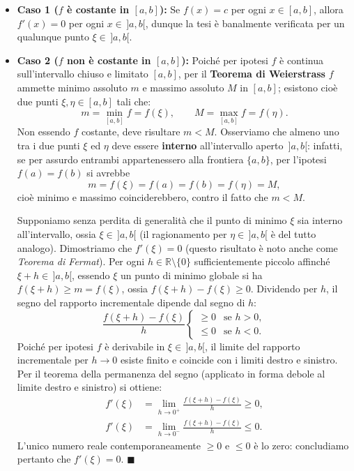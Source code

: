 \begin{itemize}
    \item \textbf{Caso 1 ($f$ è costante in $[a,b]$):} Se $f(x) = c$ per ogni $x \in [a,b]$, allora $f'(x) = 0$ per ogni $x \in \,]a,b[$, dunque la tesi è banalmente verificata per un qualunque punto $\xi \in \,]a,b[$.

    \item \textbf{Caso 2 ($f$ non è costante in $[a,b]$):} Poiché per ipotesi $f$ è continua sull'intervallo chiuso e limitato $[a,b]$, per il \textbf{Teorema di Weierstrass} $f$ ammette minimo assoluto $m$ e massimo assoluto $M$ in $[a,b]$; esistono cioè due punti $\xi, \eta \in [a,b]$ tali che:
    \[
        m = \min_{[a,b]} f = f(\xi), \qquad M = \max_{[a,b]} f = f(\eta).
    \]
    Non essendo $f$ costante, deve risultare $m < M$. Osserviamo che almeno uno tra i due punti $\xi$ ed $\eta$ deve essere \textbf{interno} all'intervallo aperto $\,]a,b[$: infatti, se per assurdo entrambi appartenessero alla frontiera $\{a, b\}$, per l'ipotesi $f(a) = f(b)$ si avrebbe
    \[
        m = f(\xi) = f(a) = f(b) = f(\eta) = M,
    \]
    cioè minimo e massimo coinciderebbero, contro il fatto che $m < M$.

    Supponiamo senza perdita di generalità che il punto di minimo $\xi$ sia interno all'intervallo, ossia $\xi \in \,]a,b[$ (il ragionamento per $\eta \in \,]a,b[$ è del tutto analogo). Dimostriamo che $f'(\xi) = 0$ (questo risultato è noto anche come \emph{Teorema di Fermat}).
    Per ogni $h \in \mathbb{R} \setminus \{0\}$ sufficientemente piccolo affinché $\xi + h \in \,]a,b[$, essendo $\xi$ un punto di minimo globale si ha $f(\xi + h) \ge m = f(\xi)$, ossia $f(\xi + h) - f(\xi) \ge 0$. Dividendo per $h$, il segno del rapporto incrementale dipende dal segno di $h$:
    \[
        \frac{f(\xi + h) - f(\xi)}{h}
        \begin{cases}
            \ge 0 & \text{se } h > 0, \\
            \le 0 & \text{se } h < 0.
        \end{cases}
    \]
    Poiché per ipotesi $f$ è derivabile in $\xi \in \,]a,b[$, il limite del rapporto incrementale per $h \to 0$ esiste finito e coincide con i limiti destro e sinistro. Per il teorema della permanenza del segno (applicato in forma debole al limite destro e sinistro) si ottiene:
    \begin{align*}
        f'(\xi) &= \lim_{h \to 0^+} \frac{f(\xi + h) - f(\xi)}{h} \ge 0, \\
        f'(\xi) &= \lim_{h \to 0^-} \frac{f(\xi + h) - f(\xi)}{h} \le 0.
    \end{align*}
    L'unico numero reale contemporaneamente $\ge 0$ e $\le 0$ è lo zero: concludiamo pertanto che $f'(\xi) = 0$. $\blacksquare$
\end{itemize}

